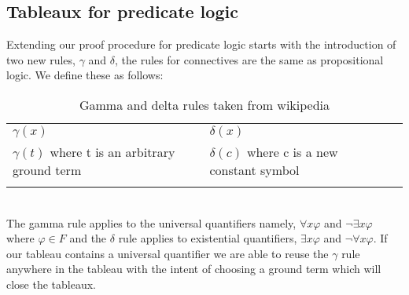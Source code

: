 \documentclass{article}%
\begin{document}
\subsection{Tableaux for predicate logic}
Extending our proof procedure for predicate logic starts with the introduction of two new rules, $\gamma$ and $\delta$, the rules for connectives are the same as propositional logic. We define these as follows: 
\begin{table}[h]
\centering
\begin{tabular}{lll}
\cline{1-2}
\multicolumn{1}{|l|}{$\gamma(x)$}                                     & \multicolumn{1}{l|}{$\delta(x)$}                                  &  \\ \cline{1-2}
\multicolumn{1}{|l|}{$\gamma(t)$ where t is an arbitrary ground term} & \multicolumn{1}{l|}{$\delta(c)$ where c is a new constant symbol} &  \\ \cline{1-2}
                                                                      &                                                                  & 
\end{tabular}
\caption{Gamma and delta rules taken from wikipedia \cite{wikipediatableau}}
\label{tab:FOLexpansionrules}
\end{table}\\
The gamma rule applies to the universal quantifiers namely, $\forall{x}\varphi$ and $\neg\exists{x}\varphi$ where $\varphi \in F$ and the $\delta$ rule applies to existential quantifiers, $\exists{x}\varphi$ and $\neg\forall{x}\varphi$. If our tableau contains a universal quantifier we are able to reuse the $\gamma$ rule anywhere in the tableau with the intent of choosing a ground term which will close the tableaux. 
\end{document}
